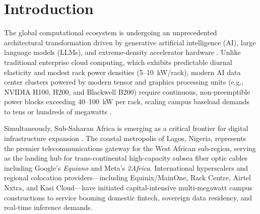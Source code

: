 \documentclass[12pt,3p,review]{elsarticle}
\begin{document}
\section{Introduction}
\label{sec:intro}

The global computational ecosystem is undergoing an unprecedented architectural transformation driven by generative artificial intelligence (AI), large language models (LLMs), and extreme-density accelerator hardware \cite{Wu2022, Faiz2024}. Unlike traditional enterprise cloud computing, which exhibits predictable diurnal elasticity and modest rack power densities (5--10~kW/rack), modern AI data center clusters powered by modern tensor and graphics processing units (e.g., NVIDIA H100, H200, and Blackwell B200) require continuous, non-preemptible power blocks exceeding 40--100~kW per rack, scaling campus baseload demands to tens or hundreds of megawatts \cite{AlTurjman2024, Narayanan2021}.

Simultaneously, Sub-Saharan Africa is emerging as a critical frontier for digital infrastructure expansion \cite{Mbate2024}. The coastal metropolis of Lagos, Nigeria, represents the premier telecommunications gateway for the West African sub-region, serving as the landing hub for trans-continental high-capacity subsea fiber optic cables including Google's \textit{Equiano} and Meta's \textit{2Africa}. International hyperscalers and regional colocation providers—including Equinix/MainOne, Rack Centre, Airtel Nxtra, and Kasi Cloud—have initiated capital-intensive multi-megawatt campus constructions to service booming domestic fintech, sovereign data residency, and real-time inference demands.
\end{document}

